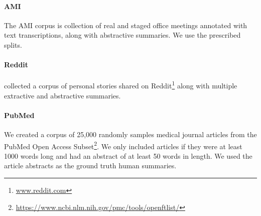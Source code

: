 \paragraph{AMI} The AMI corpus \cite{carletta2005ami} 
is collection of real and staged office meetings
annotated with text transcriptions, along with abstractive
summaries. We use the prescribed splits. 


\paragraph{Reddit} \citet{ouyang2017crowd} collected a corpus of personal 
    stories shared
 on Reddit\footnote{\url{www.reddit.com}} along with multiple extractive 
 and abstractive summaries. %

\paragraph{PubMed}{We created a corpus of 25,000 randomly samples 
    medical journal articles from the PubMed Open Access 
    Subset\footnote{\url{https://www.ncbi.nlm.nih.gov/pmc/tools/openftlist/}}.
    We only included articles if they were at least 1000 words long and 
    had an abstract of at least 50 words in length.
We used the article abstracts as the ground truth human summaries.}

